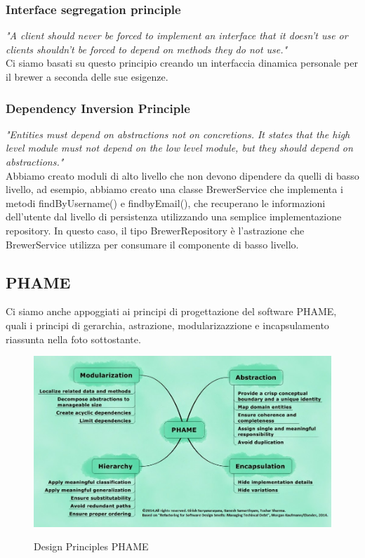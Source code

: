 \documentclass{article}
\begin{document}
\subsubsection{Interface segregation principle}
\textit{"A client should never be forced to implement an interface that it doesn’t use or clients shouldn’t be forced to depend on methods they do not use."}\\
Ci siamo basati su questo principio creando un interfaccia dinamica personale per il brewer a seconda delle sue esigenze.
\subsubsection{Dependency Inversion Principle}
\textit{"Entities must depend on abstractions not on concretions. It states that the high level module must not depend on the low level module, but they should depend on abstractions."}\\
Abbiamo creato moduli di alto livello che non devono dipendere da quelli di basso livello, ad esempio, abbiamo creato una classe BrewerService che implementa i metodi findByUsername() e findbyEmail(), che recuperano le informazioni dell'utente dal livello di persistenza utilizzando una semplice implementazione repository. In questo caso, il tipo BrewerRepository è l'astrazione che BrewerService utilizza per consumare il componente di basso livello.
\clearpage
\subsection{PHAME} 
Ci siamo anche appoggiati ai principi di progettazione del software PHAME, quali i principi di gerarchia, astrazione, modularizazzione e incapsulamento riassunta nella foto sottostante.
\begin{figure}[h!]
\centering
\includegraphics[scale=0.4]{PHAME.jpg}
\label{fig:PHAME}
\caption{Design Principles PHAME}
\end{figure}
\\
\end{document}
